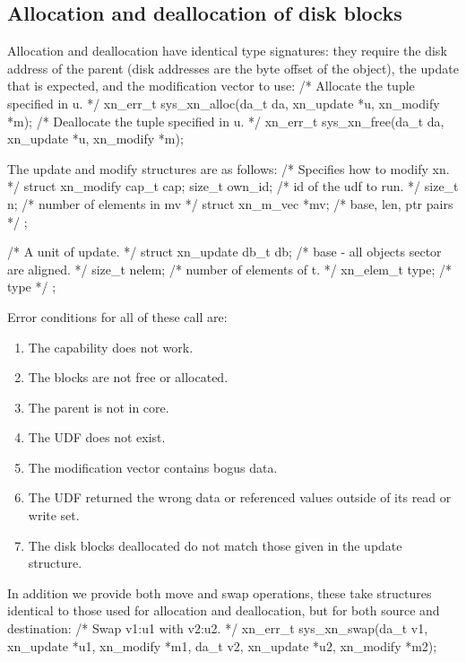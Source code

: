 \subsection{Allocation and deallocation of disk blocks}


Allocation and deallocation have identical type signatures:  they
require the disk address of the parent (disk addresses are the byte
offset of the object), the update that is expected, and the
modification vector to use:  
/* Allocate the tuple specified in u. */
xn_err_t sys_xn_alloc(da_t da, xn_update *u, xn_modify *m);
/* Deallocate the tuple specified in u. */
xn_err_t sys_xn_free(da_t da, xn_update *u, xn_modify *m);

The update and modify structures are as follows:
/* Specifies how to modify xn. */
struct xn_modify {
        cap_t   cap;
        size_t own_id;          /* id of the udf to run. */
        size_t n;               /* number of elements in mv */
        struct xn_m_vec *mv;    /* base, len, ptr pairs */
};

/* A unit of update. */
struct xn_update {
        db_t db;                /* base - all objects sector are aligned. */
        size_t nelem;           /* number of elements of t. */
        xn_elem_t type;            /* type */
};

Error conditions for all of these call are:
\begin{enumerate}
 	\item The capability does not work.
 	\item The blocks are not free or allocated.
	\item The parent is not in core.
	\item The UDF does not exist.
	\item The modification vector contains bogus data.
	\item The UDF returned the wrong data or referenced values
	outside of its read or write set.
	\item The disk blocks deallocated do not match those given
	in the update structure.
\end{enumerate}

In addition we provide both move and swap operations, these take
structures identical to those used for allocation and deallocation,
but for both source and destination:
/* Swap v1:u1 with v2:u2. */
xn_err_t sys_xn_swap(da_t v1, xn_update *u1, xn_modify *m1, 
			da_t v2, xn_update *u2, xn_modify *m2); 

